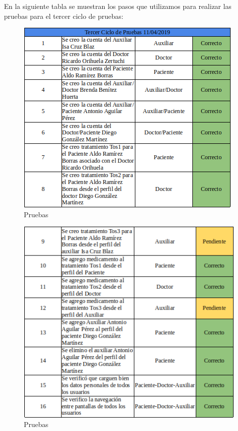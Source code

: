 En la siguiente tabla se muestran los pasos que utilizamos para realizar las pruebas para el tercer ciclo de pruebas:

\begin{figure}[!htbp]			
	\hypertarget{fig:Pruebas3}{\hspace{1pt}}
	\begin{center}
		\includegraphics[height=0.35\textheight]{Pruebas/images/ptc1}
		\caption{Pruebas}
		\label{fig:Pruebas3}
	\end{center}
\end{figure}

\begin{figure}[!htbp]			
	\hypertarget{fig:Pruebas3}{\hspace{1pt}}
	\begin{center}
		\includegraphics[height=0.35\textheight]{Pruebas/images/ptc2}
		\caption{Pruebas}
		\label{fig:Pruebas3}
	\end{center}
\end{figure}

